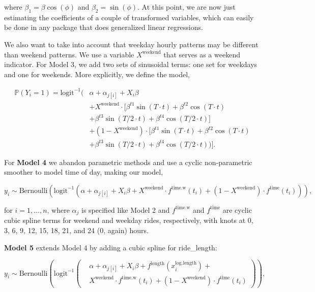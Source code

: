 \documentclass[12pt,twoside]{reedthesis}
\begin{document}
  where \(\beta_1 = \beta \cos (\phi)\) and \(\beta_2 = \sin (\phi).\) At
  this point, we are now just estimating the coefficients of a couple of
  transformed variables, which can easily be done in any package that does
  generalized linear regressions.
  
  We also want to take into account that weekday hourly patterns may be
  different than weekend patterns. We use a variable \(X^\text{weekend}\)
  that serves as a weekend indicator. For Model 3, we add two sets of
  sinusoidal terms: one set for weekdays and one for weekends. More
  explicitly, we define the model,
  
  \begin{equation}
  \begin{split}
  \mathbb{P} (Y_i=1) = \text{logit}^{-1} (&\alpha + \alpha_{j[i]} + X_i \beta \\
  &+ X^\text{weekend} \cdot [\beta^{t1} \sin(T \cdot t) + \beta^{t2} \cos (T \cdot t)\\
  &+ \beta^{t3} \sin(T/2 \cdot t) + \beta^{t4} \cos (T/2 \cdot t)]\\
  &+ (1 - X^\text{weekend}) \cdot [\beta^{t1} \sin(T \cdot t) + \beta^{t2} \cos (T \cdot t)\\
  &+ \beta^{t3} \sin(T/2 \cdot t) + \beta^{t4} \cos (T/2 \cdot t))].
  \end{split}
  \end{equation}
  
  For \textbf{Model 4} we abandon parametric methods and use a cyclic
  non-parametric smoother to model time of day, making our model,
  
  \begin{equation}
  y_i \sim \text{Bernoulli} \left(
  \text{logit}^{-1} \left( \alpha + \alpha_{j[i]} + X_i \beta + 
  X^\text{weekend} \cdot f^\text{time.w} (t_i) +
  (1 - X^\text{weekend}) \cdot f^\text{time} (t_i) \right)
  \right),
  \end{equation}
  
  for \(i = 1, \ldots, n\), where \(\alpha_j\) is specified like Model 2
  and \(f^\text{time.w}\) and \(f^\text{time}\) are cyclic cubic spline
  terms for weekend and weekday rides, respectively, with knots at 0, 3,
  6, 9, 12, 15, 18, 21, and 24 (0, again) hours.
  
  \textbf{Model 5} extends Model 4 by adding a cubic spline for
  ride\_length:
  
  \begin{equation}
  y_i \sim \text{Bernoulli} \left(
  \text{logit}^{-1} \left( \begin{split} 
  &\alpha + \alpha_{j[i]} + X_i \beta + 
  f^\text{length} (x^\text{log.length}_i) +\\
  &X^\text{weekend} \cdot f^\text{time.w} (t_i) +
  (1 - X^\text{weekend}) \cdot f^\text{time} (t_i)
  \end{split}
  \right)
  \right),
  \end{equation}
  
\end{document}
